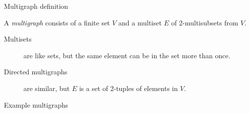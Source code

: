 \begin{frame}{Multigraph definition}
  \begin{definition}
  A \emph{multigraph} consists of a finite set $V$ and a multiset $E$ of 2-multisubsets from $V$.
  \end{definition}
  \vspace{0.2cm}
  \begin{description}
    \item[Multisets] are like sets, but the same element can be in the set more than once.
    \item[Directed multigraphs] are similar, but $E$ is a set of 2-tuples of elements in $V$.
  \end{description}
\end{frame}

\begin{frame}{Example multigraphs}
  \vspace{-10mm}
  \begin{columns}
    \begin{column}{0.45\textwidth}
      \begin{center}
        \begin{adjustbox}{max width={0.9\textwidth}, center}
        \end{adjustbox}
      \end{center}
    \end{column}
    \begin{column}{0.45\textwidth}
      \begin{center}
        \begin{adjustbox}{max width={0.9\textwidth}, center}

\end{adjustbox}
\end{center}
\end{column}
\end{columns}
\end{frame}
